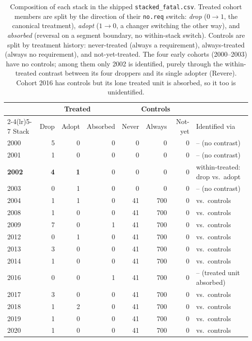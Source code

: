 \begin{table}[t]\centering
\caption{Composition of each stack in the shipped \texttt{stacked\_fatal.csv}.
Treated cohort members are split by the direction of their \texttt{no.req}
switch: \emph{drop} ($0\!\to\!1$, the canonical treatment), \emph{adopt}
($1\!\to\!0$, a changer switching the other way), and \emph{absorbed}
(reversal on a segment boundary, no within-stack switch). Controls are split by
treatment history: never-treated (always a requirement), always-treated (always
no requirement), and not-yet-treated. The four early cohorts (2000--2003) have no
controls; among them only 2002 is identified, purely through the within-treated
contrast between its four droppers and its single adopter (Revere). Cohort 2016
has controls but its lone treated unit is absorbed, so it too is unidentified.}
\label{tab:stack-composition}
\begin{tabular}{lrrrrrrl}
\toprule
& \multicolumn{3}{c}{Treated} & \multicolumn{3}{c}{Controls} & \\
\cmidrule(lr){2-4}\cmidrule(lr){5-7}
Stack & Drop & Adopt & Absorbed & Never & Always & Not-yet & Identified via \\
\midrule
2000 & 5 & 0 & 0 & 0 & 0 & 0 & -- (no contrast) \\
2001 & 1 & 0 & 0 & 0 & 0 & 0 & -- (no contrast) \\
\textbf{2002} & \textbf{4} & \textbf{1} & 0 & 0 & 0 & 0 & within-treated: drop vs.\ adopt \\
2003 & 0 & 1 & 0 & 0 & 0 & 0 & -- (no contrast) \\
2004 & 1 & 1 & 0 & 41 & 700 & 0 & vs.\ controls \\
2008 & 1 & 0 & 0 & 41 & 700 & 0 & vs.\ controls \\
2009 & 7 & 0 & 1 & 41 & 700 & 0 & vs.\ controls \\
2012 & 0 & 1 & 0 & 41 & 700 & 0 & vs.\ controls \\
2013 & 3 & 0 & 0 & 41 & 700 & 0 & vs.\ controls \\
2014 & 1 & 0 & 0 & 41 & 700 & 0 & vs.\ controls \\
2016 & 0 & 0 & 1 & 41 & 700 & 0 & -- (treated unit absorbed) \\
2017 & 3 & 0 & 0 & 41 & 700 & 0 & vs.\ controls \\
2018 & 1 & 2 & 0 & 41 & 700 & 0 & vs.\ controls \\
2019 & 1 & 0 & 0 & 41 & 700 & 0 & vs.\ controls \\
2020 & 1 & 0 & 0 & 41 & 700 & 0 & vs.\ controls \\
\bottomrule
\end{tabular}
\end{table}

